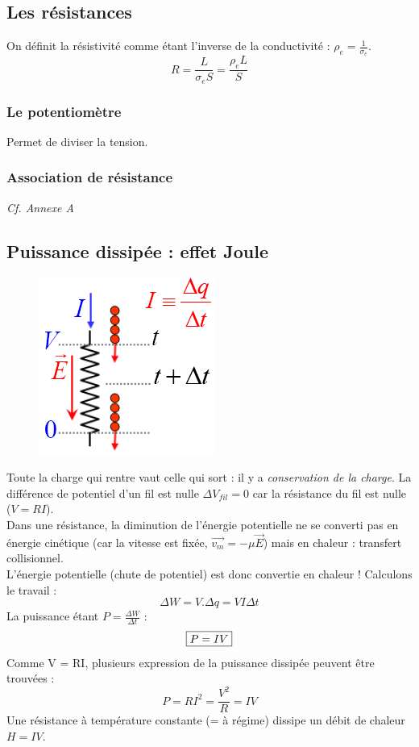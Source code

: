 \documentclass	[11pt, a4paper, openany]{book}
\begin{document}
\subsection{Les résistances}
On définit la résistivité comme étant l'inverse de la conductivité : $\rho_e = \frac{1}{\sigma_e}$.
\begin{equation}
	R = \frac{L}{\sigma_e S} = \frac{\rho_e L}{S}
\end{equation}

\subsubsection{Le potentiomètre}
Permet de diviser la tension.

\subsubsection{Association de résistance}
\textit{Cf. Annexe A}

\subsection{Puissance dissipée : effet Joule}
\begin{figure}
	\includegraphics[scale=0.44]{es/image18.png}
\end{figure}
Toute la charge qui rentre vaut celle qui sort : il y a \textit{conservation de la charge}. La différence de potentiel d'un fil est nulle $\Delta V_{fil} = 0$ car la résistance du fil est nulle ($V = RI$).\\

Dans une résistance, la diminution de l'énergie potentielle ne se converti pas en énergie cinétique (car la vitesse est fixée, $\vec{v_m} = -\mu \vec{E}$) mais en chaleur : transfert collisionnel.\\
L'énergie potentielle (chute de potentiel) est donc convertie en chaleur ! Calculons le travail :
\begin{equation}
	\Delta W = V.\Delta q = VI \Delta t
\end{equation}
La puissance étant $P = \frac{\Delta W}{\Delta t}$ :
\begin{equation}
	\fbox{$P = IV$}
\end{equation}
Comme V = RI, plusieurs expression de la puissance dissipée peuvent être trouvées :
\begin{equation}
	P = RI^2 = \frac{V^2}{R} = IV
\end{equation}
Une résistance à température constante (= à régime) dissipe un débit de chaleur $H = IV$.
\end{document}
